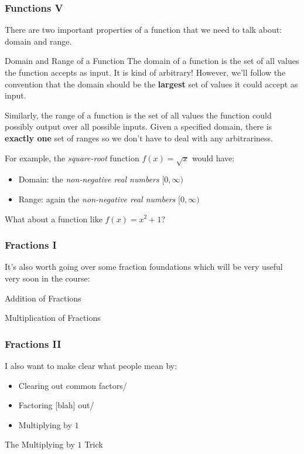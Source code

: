 \documentclass{ltx-talk}
\begin{document}
\begin{frame}
  \frametitle{Functions V}
  There are two important properties of a function that we need to talk about: domain and range. \pause

  \begin{block}{Domain and Range of a Function}
    The domain of a function  is the set of all values
    the function accepts as input. \pause
    It is kind of arbitrary! \pause
    However, we'll follow the convention that the 
    domain should be the \textbf{largest} set of values
    it could accept as input. \pause

    Similarly, the range of a function 
    is the set of all values the function could possibly output
    over all possible inputs. Given a specified domain, 
    there is \textbf{exactly one} set of ranges \pause
    so we don't have to deal with any arbitrariness.
  \end{block}

  For example, the \textit{square-root} function $f(x) = \sqrt{x}$
  would have:
  \begin{itemize}
    \item Domain: \pause the \textit{non-negative real numbers} $[0, \infty)$ \pause
    \item Range: \pause again the \textit{non-negative real numbers} $[0, \infty)$ \pause
  \end{itemize}

  What about a function like $f(x) = x^2 + 1$?
\end{frame}

\begin{frame}
  \frametitle{Fractions I}

  It's also worth going over some fraction foundations which will be
  very useful very soon in the course:

  \begin{block}{Addition of Fractions}
    \vspace{0.5in}
  \end{block} \pause

  \begin{block}{Multiplication of Fractions}
    \vspace{0.5in}
  \end{block}

\end{frame}

\begin{frame}
  \frametitle{Fractions II}
  I also want to make clear what people mean by: \pause
  \begin{itemize}
    \item Clearing out common factors/
    \item Factoring [blah] out/
    \item Multiplying by $1$
  \end{itemize}

  \begin{alertblock}{The Multiplying by $1$ Trick}
    \vspace{1in}
  \end{alertblock}
\end{frame}
\end{document}
